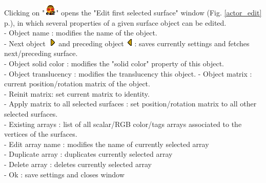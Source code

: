 Clicking on "\includegraphics[scale=0.7]{images/06/objects/actor_edit.png}" opens the "Edit first selected surface" window (Fig. \ref{actor_edit} p.\pageref{actor_edit}), in which several properties of a given surface object can be edited.
\\
- Object name : modifies the name of the object.\\
- Next object \includegraphics[scale=0.7]{images/06/objects/s_right.png} and preceding object \includegraphics[scale=0.7]{images/06/objects/s_left.png}: saves currently  settings and fetches next/preceding surface.\\
- Object solid color : modifies the "solid color" property of this object.\\
- Object translucency : modifies the translucency this object.
- Object matrix : current position/rotation matrix of the object.\\
- Reinit matrix: set current matrix to identity.\\
- Apply matrix to all selected surfaces : set position/rotation matrix to all other selected surfaces.\\
- Existing arrays : list of all scalar/RGB color/tags arrays associated to the vertices of the surfaces.\\
- Edit array name : modifies the name of currently selected array\\
- Duplicate array : duplicates currently selected array\\
- Delete array : deletes currently selected array\\
- Ok : save settings and closes window



